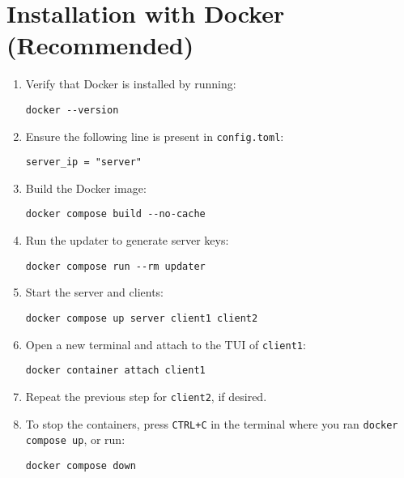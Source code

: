 \section{Installation with Docker (Recommended)}
\label{sec:docker}

\begin{enumerate}
    \item Verify that Docker is installed by running:

        \begin{lstlisting}
docker --version
        \end{lstlisting}

    \item Ensure the following line is present in \texttt{config.toml}:

        \begin{lstlisting}
server_ip = "server"
        \end{lstlisting}

    \item Build the Docker image:

        \begin{lstlisting}
docker compose build --no-cache
        \end{lstlisting}

    \item Run the updater to generate server keys:

        \begin{lstlisting}
docker compose run --rm updater
        \end{lstlisting}

    \item Start the server and clients:

        \begin{lstlisting}
docker compose up server client1 client2
        \end{lstlisting}

    \item Open a new terminal and attach to the TUI of \texttt{client1}:

        \begin{lstlisting}
docker container attach client1
        \end{lstlisting}

    \item Repeat the previous step for \texttt{client2}, if desired.

    \item To stop the containers, press \texttt{CTRL+C} in the terminal where you ran \texttt{docker compose up}, or run:

        \begin{lstlisting}
docker compose down
        \end{lstlisting}
\end{enumerate}

